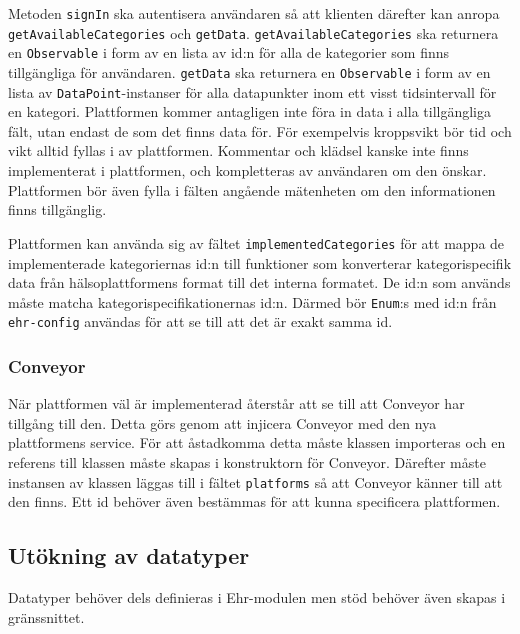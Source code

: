 \documentclass[techdoc/techdoc.tex]{subfiles}
\begin{document}
Metoden \texttt{signIn} ska autentisera användaren så att klienten därefter kan
anropa \texttt{getAvailable\-Categories} och \texttt{getData}.
\texttt{getAvailableCategories} ska returnera en \texttt{Observable} i form av
en lista av id:n för alla de kategorier som finns tillgängliga för användaren.
\texttt{getData} ska returnera en \texttt{Observable} i form av en lista av
\texttt{DataPoint}-instanser för alla datapunkter inom ett visst tidsintervall
för en kategori. Plattformen kommer antagligen inte föra in data i alla
tillgängliga fält, utan endast de som det finns data för. För exempelvis
kroppsvikt bör tid och vikt alltid fyllas i av plattformen. Kommentar och
klädsel kanske inte finns implementerat i plattformen, och kompletteras av
användaren om den önskar. Plattformen bör även fylla i fälten angående
mätenheten om den informationen finns tillgänglig.

Plattformen kan använda sig av fältet \texttt{implementedCategories} för att
mappa de implementerade kategoriernas id:n till funktioner som konverterar
kategorispecifik data från hälsoplattformens format till det interna formatet.
De id:n som används måste matcha kategorispecifikationernas id:n. Därmed bör
\texttt{Enum}:s med id:n från \texttt{ehr-config} användas för att se till att
det är exakt samma id.

\subsubsection{Conveyor}
När plattformen väl är implementerad återstår att se till att Conveyor har
tillgång till den. Detta görs genom att injicera Conveyor med den nya
plattformens service. För att åstadkomma detta måste klassen importeras och en
referens till klassen måste skapas i konstruktorn för Conveyor. Därefter måste
instansen av klassen läggas till i fältet \texttt{platforms} så att Conveyor
känner till att den finns. Ett id behöver även bestämmas för att kunna
specificera plattformen.


\subsection{Utökning av datatyper} \label{sec:dev-datatype}
Datatyper behöver dels definieras i Ehr-modulen men stöd behöver även skapas
i gränssnittet.
\end{document}
